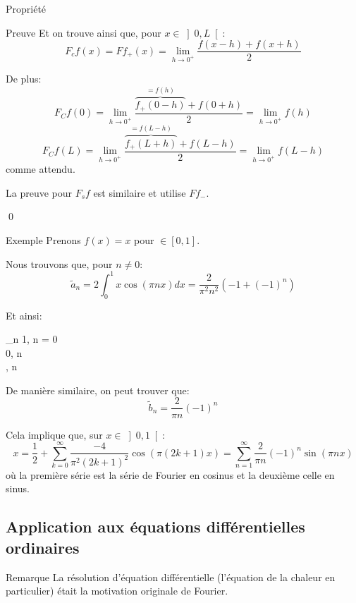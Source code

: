 \documentclass[a4paper]{article}
\begin{document}
\begin{parag}{Propriété}
\begin{subparag}{Preuve}
        Et on trouve ainsi que, pour $x \in \left]0, L\right[ $: 
        \[F_c f\left(x\right) = F f_{+}\left(x\right) = \lim_{h \to 0^+} \frac{f\left(x - h\right) + f\left(x + h\right)}{2}\]

        De plus: 
        \[F_C f\left(0\right) = \lim_{h \to 0^+} \frac{\overbrace{f_+\left(0 - h\right)}^{= f\left(h\right)} + f\left(0 + h\right)}{2} = \lim_{h \to 0^+} f\left(h\right)\]
        \[F_C f\left(L\right) = \lim_{h \to 0^+} \frac{\overbrace{f_+\left(L + h\right)}^{= f\left(L - h\right)} + f\left(L - h\right)}{2} = \lim_{h \to 0^+} f\left(L - h\right)\]
        comme attendu.

        La preuve pour $F_s f$ est similaire et utilise $F f_-$.

        \qed
    \end{subparag}
\end{parag}

\begin{parag}{Exemple}
    Prenons $f\left(x\right) = x$ pour $ \in \left[0, 1\right] $.

    Nous trouvons que, pour $n \neq 0$: 
    \[\widetilde{a}_n = 2 \int_{0}^{1} x\cos\left(\pi n x\right)dx = \frac{2}{\pi^2 n^2} \left(-1 + \left(-1\right)^n\right)\]
    
    Et ainsi:
    \begin{functionbypart}{_n}
    1, \mathspace n = 0 \\
    0, \mathspace n   \\
    , \mathspace n 
    \end{functionbypart}

    De manière similaire, on peut trouver que: 
    \[\widetilde{b}_n = \frac{2}{\pi n}\left(-1\right)^n\]
    
    Cela implique que, sur $x \in \left]0, 1\right[ $: 
    \[x = \frac{1}{2} + \sum_{k=0}^{\infty} \frac{-4}{\pi^2 \left(2k + 1\right)^2} \cos\left(\pi\left(2k + 1\right)x\right) = \sum_{n=1}^{\infty} \frac{2}{\pi n} \left(-1\right)^n \sin\left(\pi n x\right)\]
    où la première série est la série de Fourier en cosinus et la deuxième celle en sinus.
\end{parag}

\subsection[Application aux EDO]{Application aux équations différentielles ordinaires}
\begin{parag}{Remarque}
    La résolution d'équation différentielle (l'équation de la chaleur en particulier) était la motivation originale de Fourier.
\end{parag}
\end{document}
